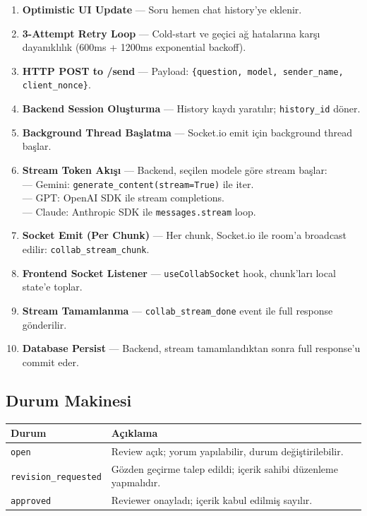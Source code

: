 \documentclass[11pt,a4paper]{article}
\begin{document}
\begin{enumerate}[leftmargin=1.5em]
  \item \textbf{Optimistic UI Update} — Soru hemen chat history'ye eklenir.
  \item \textbf{3-Attempt Retry Loop} — Cold-start ve geçici ağ hatalarına karşı dayanıklılık (600ms + 1200ms exponential backoff).
  \item \textbf{HTTP POST to /send} — Payload: \texttt{\{question, model, sender\_name, client\_nonce\}}.
  \item \textbf{Backend Session Oluşturma} — History kaydı yaratılır; \texttt{history\_id} döner.
  \item \textbf{Background Thread Başlatma} — Socket.io emit için background thread başlar.
  \item \textbf{Stream Token Akışı} — Backend, seçilen modele göre stream başlar:\\
        — Gemini: \texttt{generate\_content(stream=True)} ile iter.\\
        — GPT: OpenAI SDK ile stream completions.\\
        — Claude: Anthropic SDK ile \texttt{messages.stream} loop.
  \item \textbf{Socket Emit (Per Chunk)} — Her chunk, Socket.io ile room'a broadcast edilir: \texttt{collab\_stream\_chunk}.
  \item \textbf{Frontend Socket Listener} — \texttt{useCollabSocket} hook, chunk'ları local state'e toplar.
  \item \textbf{Stream Tamamlanma} — \texttt{collab\_stream\_done} event ile full response gönderilir.
  \item \textbf{Database Persist} — Backend, stream tamamlandıktan sonra full response'u commit eder.
\end{enumerate}

\subsection{Durum Makinesi}

\begin{tabularx}{\textwidth}{@{} L{3.5cm} X @{}}
\toprule
\textbf{Durum} & \textbf{Açıklama} \\
\midrule
\texttt{open} & Review açık; yorum yapılabilir, durum değiştirilebilir. \\
\addlinespace
\texttt{revision\_requested} & Gözden geçirme talep edildi; içerik sahibi düzenleme yapmalıdır. \\
\addlinespace
\texttt{approved} & Reviewer onayladı; içerik kabul edilmiş sayılır. \\
\bottomrule
\end{tabularx}
\end{document}
